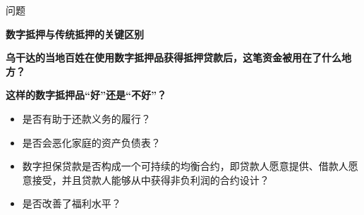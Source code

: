 \begin{frame}[allowframebreaks]{问题}
    \begin{questionblock}
    \textbf{数字抵押与传统抵押的关键区别}
    \end{questionblock}
  

  
   \begin{questionblock}
      \textbf{乌干达的当地百姓在使用数字抵押品获得抵押贷款后，这笔资金被用在了什么地方？}
    \end{questionblock}

    \medskip

   \begin{questionblock}
      \textbf{这样的数字抵押品“好”还是“不好”？}
      \begin{itemize}
        \item 是否有助于还款义务的履行？
        \item 是否会恶化家庭的资产负债表？
        \item 数字担保贷款是否构成一个可持续的均衡合约，即贷款人愿意提供、借款人愿意接受，并且贷款人能够从中获得非负利润的合约设计？
        \item 是否改善了福利水平？
      \end{itemize}
  \end{questionblock}
\end{frame}
